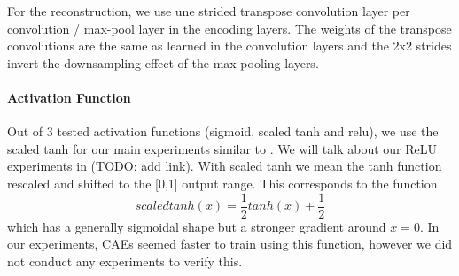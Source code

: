 \documentclass[draft]{article}
\begin{document}


    For the reconstruction, we use une strided transpose convolution layer per convolution / max-pool layer in the encoding layers. The weights of the transpose convolutions are the same as learned in the convolution layers and the 2x2 strides invert the downsampling effect of the max-pooling layers.

    \paragraph{Activation Function} Out of 3 tested activation functions (sigmoid, scaled tanh and relu), we use the scaled tanh for our main experiments similar to \citep{masci11}. We will talk about our ReLU experiments in (TODO: add link). With scaled tanh we mean the tanh function rescaled and shifted to the [0,1] output range. This corresponds to the function $$scaledtanh(x) = \frac{1}{2}tanh(x) + \frac{1}{2}$$ which has a generally sigmoidal shape but a stronger gradient around $x = 0$. In our experiments, CAEs seemed faster to train using this function, however we did not conduct any experiments to verify this.
\end{document}
